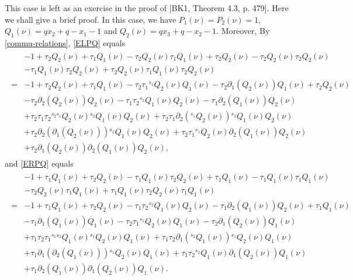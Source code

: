 \documentclass[11pt, reqno]{amsart} \textwidth=14.9cm \oddsidemargin=1cm \evensidemargin=1cm
\theoremstyle{definition}
\numberwithin{equation}{section}
\begin{document}
\vspace{0.3cm}\noindent This case is left as an exercise in the proof of [BK1, Theorem 4.3, p. 479]. Here we shall give a brief proof. In this case, we have $P_{1}(\nu)=P_{2}(\nu)=1$, $Q_{1}(\nu)=qx_2+q-x_1-1$ and $Q_{2}(\nu)=qx_3+q-x_2-1.$ Moreover, By \eqref{commu-relations}, \eqref{ELPQ} equals
\begin{align*}
\begin{split}
&-1+\tau_2Q_2(\nu)+\tau_1Q_1(\nu)-\tau_2Q_2(\nu)\tau_1Q_1(\nu)+\tau_2Q_2(\nu)-\tau_2Q_2(\nu)\tau_2Q_2(\nu)\\&-\tau_1Q_1(\nu)\tau_2Q_2(\nu)
+\tau_2Q_2(\nu)\tau_1Q_1(\nu)\tau_2Q_2(\nu)\\=&-1+\tau_2Q_2(\nu)+\tau_1Q_1(\nu)-\tau_2\tau_1{}^{s_{1}}Q_2(\nu)Q_1(\nu)
-\tau_2\partial_{1}(Q_2(\nu))Q_1(\nu)+\tau_2Q_2(\nu)\\&-\tau_2\partial_{2}(Q_2(\nu))Q_2(\nu)-\tau_1\tau_2{}^{s_{2}}Q_1(\nu)Q_2(\nu)
-\tau_1\partial_{2}(Q_1(\nu))Q_2(\nu)\\&+\tau_2\tau_1\tau_2{}^{s_{2}s_{1}}Q_{2}(\nu){}^{s_{2}}Q_1(\nu)Q_2(\nu)+
\tau_2\tau_1\partial_{2}({}^{s_{1}}Q_2(\nu)){}^{s_{2}}Q_1(\nu)Q_2(\nu)\\
&+\tau_2\partial_{2}(\partial_{1}(Q_2(\nu))){}^{s_{2}}Q_1(\nu)Q_2(\nu)+\tau_2\tau_1{}^{s_{1}}Q_2(\nu)\partial_{2}(Q_1(\nu))Q_2(\nu)\\
&+\tau_2\partial_{1}(Q_2(\nu))\partial_{2}(Q_1(\nu))Q_2(\nu),
\end{split}
\end{align*}
and \eqref{ERPQ} equals
\begin{align*}
\begin{split}
&-1+\tau_1Q_1(\nu)+\tau_2Q_2(\nu)-\tau_1Q_1(\nu)\tau_2Q_2(\nu)+\tau_1Q_1(\nu)-\tau_1Q_1(\nu)\tau_1Q_1(\nu)\\&-\tau_2Q_2(\nu)\tau_1Q_1(\nu)
+\tau_1Q_1(\nu)\tau_2Q_2(\nu)\tau_1Q_1(\nu)\\
=&-1+\tau_1Q_1(\nu)+\tau_2Q_2(\nu)-\tau_1\tau_2{}^{s_{2}}Q_1(\nu)Q_2(\nu)
-\tau_1\partial_{2}(Q_1(\nu))Q_2(\nu)+\tau_1Q_1(\nu)\\
&-\tau_1\partial_{1}(Q_1(\nu))Q_1(\nu)-\tau_2\tau_1{}^{s_{1}}Q_2(\nu)Q_1(\nu)
-\tau_2\partial_{1}(Q_2(\nu))Q_1(\nu)\\
&+\tau_1\tau_2\tau_1{}^{s_{1}s_{2}}Q_{1}(\nu){}^{s_{1}}Q_2(\nu)Q_1(\nu)+
\tau_1\tau_2\partial_{1}({}^{s_{2}}Q_1(\nu)){}^{s_{1}}Q_2(\nu)Q_1(\nu)\\
&+\tau_1\partial_{1}(\partial_{2}(Q_1(\nu))){}^{s_{1}}Q_2(\nu)Q_1(\nu)+\tau_1\tau_2{}^{s_{2}}Q_1(\nu)\partial_{1}(Q_2(\nu))Q_1(\nu)\\
&+\tau_1\partial_{2}(Q_1(\nu))\partial_{1}(Q_2(\nu))Q_1(\nu).
\end{split}
\end{align*}
\end{document}
